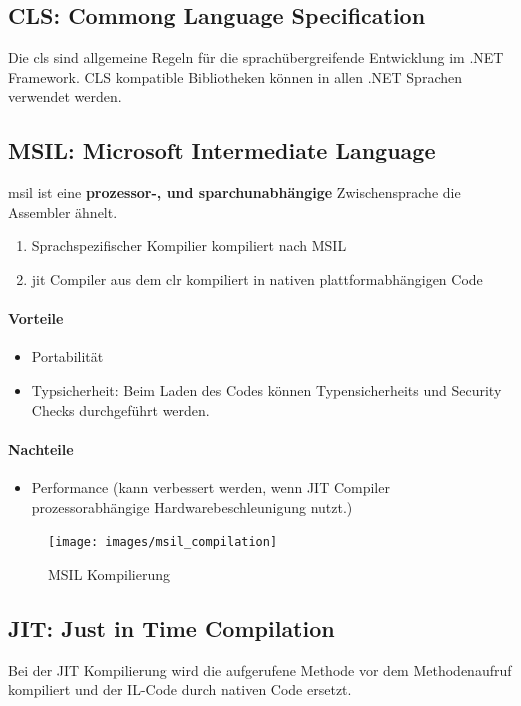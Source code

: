 \subsection{CLS: Commong Language Specification}
Die \gls{cls} sind allgemeine Regeln für die sprachübergreifende Entwicklung im .NET Framework. CLS kompatible Bibliotheken können in allen .NET Sprachen verwendet werden.

\subsection{MSIL: Microsoft Intermediate Language}
\gls{msil} ist eine \textbf{prozessor-, und sparchunabhängige} Zwischensprache die Assembler ähnelt. 
\begin{enumerate}
	\item Sprachspezifischer Kompilier kompiliert nach MSIL
	\item \gls{jit} Compiler aus dem \gls{clr} kompiliert in nativen plattformabhängigen Code
\end{enumerate}
\paragraph{Vorteile}
\begin{itemize}
	\item Portabilität
	\item Typsicherheit: Beim Laden des Codes können Typensicherheits und Security Checks durchgeführt werden.
\end{itemize}
\paragraph{Nachteile}
\begin{itemize}
	\item Performance (kann verbessert werden, wenn JIT Compiler prozessorabhängige Hardwarebeschleunigung nutzt.)
\end{itemize}

\begin{figure}[h]
\centering
\texttt{[image: images/msil\_compilation]}
\caption{MSIL Kompilierung}
\label{fig:msilcompilation}
\end{figure}

\subsection{JIT: Just in Time Compilation}
Bei der JIT Kompilierung wird die aufgerufene Methode vor dem Methodenaufruf kompiliert und der IL-Code durch nativen Code ersetzt.

